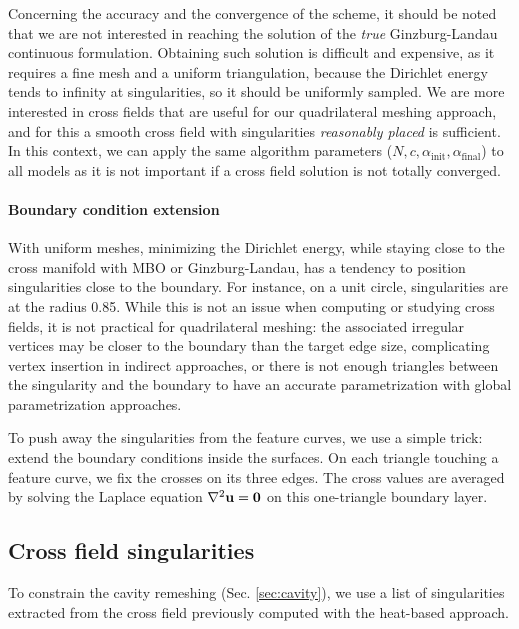 \documentclass[AMA,STIX1COL]{WileyNJD-v2}
\newcommand{\vu}{\ensuremath{\mathbf{u}}}
\newcommand\rsec[1]{Sec. \ref{#1}}
\begin{document}
{Concerning the accuracy and the convergence of the scheme, it should be noted
that we are not interested in reaching the solution of the {\it true}
Ginzburg-Landau continuous formulation.  Obtaining such solution is difficult and expensive, as it
requires a fine mesh and a uniform triangulation, because the Dirichlet energy
tends to infinity at singularities, so it should be uniformly sampled. We are more
interested in cross fields that are useful for our quadrilateral meshing
approach, and for this a smooth cross field with singularities \emph{reasonably
placed} is sufficient.  In this context,
we can apply the same algorithm parameters ($N,c,\alpha_\text{init},\alpha_\text{final}$)
to all models as it is not important if a cross field solution is not
totally converged.

\paragraph{Boundary condition extension}

With uniform meshes, minimizing the Dirichlet energy, while staying close to
the cross manifold with MBO or Ginzburg-Landau, has a tendency to position
singularities close to the boundary. For instance, on a unit circle,
singularities are at the radius 0.85. While this is not an issue when
computing or studying cross fields, it is not practical for quadrilateral
meshing: the associated irregular vertices may be closer to the boundary than
the target edge size, complicating vertex insertion in indirect approaches, or
there is not enough triangles between the singularity and the boundary to have
an accurate parametrization with global parametrization approaches.

To push away the singularities from the feature curves, we use a simple trick:
extend the boundary conditions inside the surfaces. On each triangle touching
a feature curve, we fix the crosses on its three edges. The cross values
are averaged by solving the Laplace equation $\nabla^2 \vu = {\bf 0}$ on this
one-triangle boundary layer.



\subsection{Cross field singularities}
\label{ss:singularities}

To constrain the cavity remeshing (\rsec{sec:cavity}), we use a list of 
singularities extracted from the cross field previously computed with
the heat-based approach.

}
\end{document}
